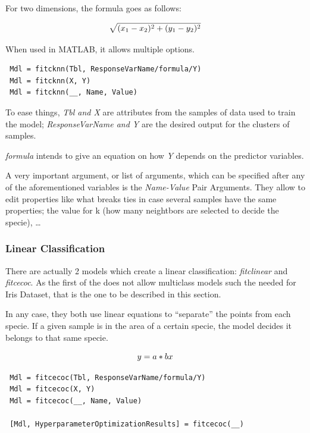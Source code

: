 \documentclass[11pt]{article}
\begin{document}
For two dimensions, the formula goes as follows:

\begin{equation}
 \centering
 \sqrt{(x_1 - x_2)^2 + (y_1 - y_2)^2}
\end{equation}

When used in MATLAB, it allows multiple options.

\begin{verbatim}
 Mdl = fitcknn(Tbl, ResponseVarName/formula/Y)
 Mdl = fitcknn(X, Y)
 Mdl = fitcknn(__, Name, Value)
\end{verbatim}

To ease things, \textit{Tbl and X} are attributes from the samples of data 
used to train the model; \textit{ResponseVarName and Y} are the desired output
for the clusters of samples.

\textit{formula} intends to give an equation on how \textit{Y} depends on the
predictor variables.

A very important argument, or list of arguments, which can be specified after
any of the aforementioned variables is the \textit{Name-Value} Pair Arguments.
They allow to edit properties like what breaks ties in case several samples have
the same properties; the value for k (how many neightbors are selected to decide
the specie), \ldots

\subsubsection{Linear Classification}

There are actually 2 models which create a linear classification:
\textit{fitclinear} and \textit{fitcecoc}. As the first of the does not allow
multiclass models such the needed for Iris Dataset, that is the one to be
described in this section.

In any case, they both use linear equations to ``separate'' the points from each
specie. If a given sample is in the area of a certain specie, the model decides
it belongs to that same specie.

\begin{equation}
 \centering
 y = a * bx
\end{equation}

\begin{verbatim}
 Mdl = fitcecoc(Tbl, ResponseVarName/formula/Y)
 Mdl = fitcecoc(X, Y)
 Mdl = fitcecoc(__, Name, Value)

 [Mdl, HyperparameterOptimizationResults] = fitcecoc(__)
\end{verbatim}
\end{document}
